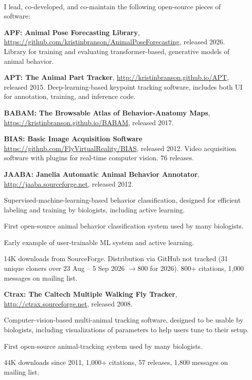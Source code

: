 \documentclass[11pt, letterpaper]{awesome-cv}
\begin{document}
\vspace{\acvSectionContentTopSkip}\\
I lead, co-developed, and co-maintain the following open-source pieces of software:\\
\begin{cvitems}
\item \textbf{APF: Animal Pose Forecasting Library}, \url{https://github.com/kristinbranson/AnimalPoseForecasting}, released 2026. Library for training and evaluating transformer-based, generative models of animal behavior.
\item \textbf{APT: The Animal Part Tracker}, \url{http://kristinbranson.github.io/APT}, released 2015. Deep-learning-based keypoint tracking software, includes both UI for annotation, training, and inference code.
\item \textbf{BABAM: The Browsable Atlas of Behavior-Anatomy Maps}, \url{https://kristinbranson.github.io/BABAM}, released 2017. 
\item \textbf{BIAS: Basic Image Acquisition Software} \url{https://github.com/FlyVirtualReality/BIAS}, released 2012. Video acquisition software with plugins for real-time computer vision. 76 releases. 
\item \textbf{JAABA: Janelia Automatic Animal Behavior Annotator}, \url{http://jaaba.sourceforge.net}, released 2012. 
\vspace{4mm}
\begin{cvitems}
    \item Supervised-machine-learning-based behavior classification, designed for efficient labeling and training by biologists, including active learning.  
    \item First open-source animal behavior classification system used by many biologists. 
    \item Early example of user-trainable ML system and active learning. 
    \item 14K downloads from SourceForge. Distribution via GitHub not tracked (31 unique cloners over 23 Aug – 5 Sep 2026 $\rightarrow 800$ for 2026). 800+ citations, 1,000 messages on mailing list.
\end{cvitems}
\vspace{4mm}
\item \textbf{Ctrax: The Caltech Multiple Walking Fly Tracker}, \url{http://ctrax.sourceforge.net}, released 2008.
\vspace{4mm}
\begin{cvitems}
    \item Computer-vision-based multi-animal tracking software, designed to be usable by biologists, including visualizations of parameters to help users tune to their setup. 
    \item First open-source animal-tracking system used by many biologists. 
    \item 44K downloads since 2011, 1,000+ citations, 57 releases, 1,800 messages on mailing list.   
\end{cvitems}
\vspace{4mm}
\end{cvitems}
\vspace{\acvSectionContentTopSkip}
\end{document}
